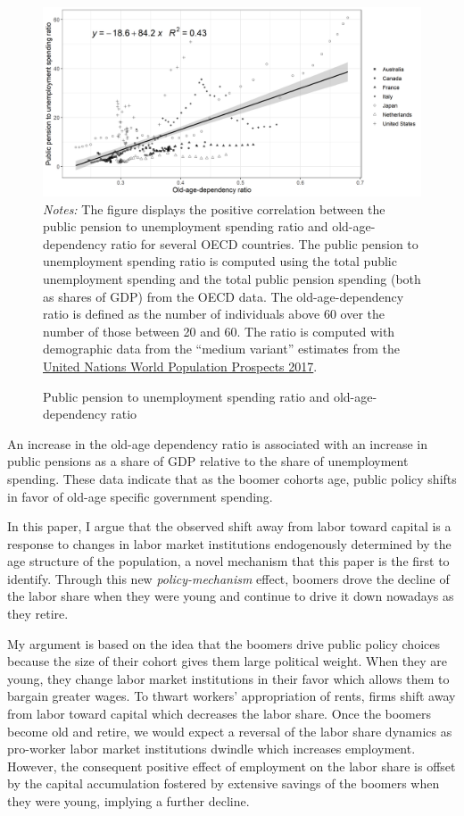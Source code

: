 \begin{figure}[!tb]
	\centering
	\caption{Public pension to unemployment spending ratio and old-age-dependency ratio}\label{chap1-fig:emp-pubdepcor}
	\includegraphics[width=\linewidth]{chap1/graphic/emp-pubdepcor.png}
	\vspace{-3em}
	\justify\singlespacing\footnotesize\textit{Notes:} The figure displays the positive correlation between the public pension to unemployment spending ratio and old-age-dependency ratio for several OECD countries. The public pension to unemployment spending ratio is computed using the total public unemployment spending and the total public pension spending (both as shares of GDP) from the OECD data. The old-age-dependency ratio is defined as the number of individuals above 60 over the number of those between 20 and 60. The ratio is computed with demographic data from the ``medium variant'' estimates from the \href{https://population.un.org/wpp/}{United Nations World Population Prospects 2017}.
\end{figure}
An increase in the old-age dependency ratio is associated with an increase in public pensions as a share of GDP relative to the share of unemployment spending. These data indicate that as the boomer cohorts age, public policy shifts in favor of old-age specific government spending.

In this paper, I argue that the observed shift away from labor toward capital is a response to changes in labor market institutions endogenously determined by the age structure of the population, a novel mechanism that this paper is the first to identify. Through this new \textit{policy-mechanism} effect, boomers drove the decline of the labor share when they were young and continue to drive it down nowadays as they retire. 

My argument is based on the idea that the boomers drive public policy choices because the size of their cohort gives them large political weight. When they are young, they change labor market institutions in their favor which allows them to bargain greater wages. To thwart workers' appropriation of rents, firms shift away from labor toward capital which decreases the labor share. Once the boomers become old and retire, we would expect a reversal of the labor share dynamics as pro-worker labor market institutions dwindle which increases employment. However, the consequent positive effect of employment on the labor share is offset by the capital accumulation fostered by extensive savings of the boomers when they were young, implying a further decline.

